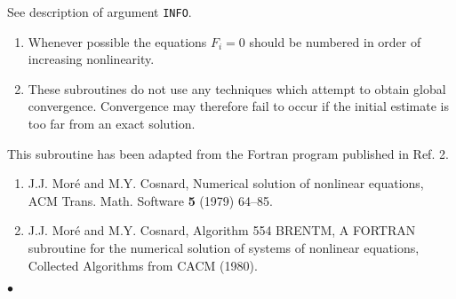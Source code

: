 \Errorh
See description of argument {\tt INFO}.
\Notes
\begin{enumerate}
\item Whenever possible the equations $F_i=0$ should be numbered
in order of increasing nonlinearity.
\item These subroutines do not use any techniques which attempt to
obtain global convergence. Convergence may therefore fail to occur
if the initial estimate is too far from an exact solution.
\end{enumerate}
\Source
This subroutine has been adapted from the Fortran program
published in Ref. 2.
\Refer
\begin{enumerate}
\item  J.J. Mor\'e and M.Y. Cosnard, Numerical solution of nonlinear
equations, ACM Trans. Math. Software {\bf 5} (1979) 64--85.
\item  J.J. Mor\'e and M.Y. Cosnard,
Algorithm 554 BRENTM, A FORTRAN subroutine for the numerical
solution of systems of nonlinear equations,
Collected Algorithms from CACM (1980).
\end{enumerate}
$\bullet$
